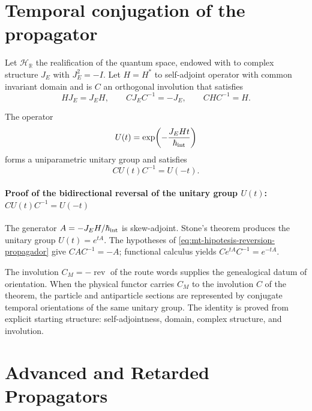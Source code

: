 \section{Temporal conjugation of the propagator}

Let $\mathcal H_{\mathbb R}$ the realification of the quantum space, endowed
with to complex structure $J_E$ with $J_E^2=-I$. Let $H=H^*$ to self-adjoint operator
with common invariant domain and is $C$ an orthogonal involution
that satisfies
\begin{equation}
 HJ_E=J_EH,\qquad
 CJ_EC^{-1}=-J_E,
 \qquad CHC^{-1}=H.
 \label{eq:mt-hipotesis-reversion-propagador}
\end{equation}

\begin{resultado}[title={Theorem: Bidirectional reversal of the evolution group}]
\label{thm:mt-reversion-propagador}
The operator
\begin{equation}
 U(t)=\exp\!\left(-\frac{J_EHt}{\hbar_{\rm int}}\right)
 \label{eq:mt-grupo-evolucion}
\end{equation}
forms a uniparametric unitary group and satisfies
\begin{equation}
 \boxed{CU(t)C^{-1}=U(-t)}.
 \label{eq:mt-reversion-unitaria}
\end{equation}
\end{resultado}

\paragraph{Proof of the bidirectional reversal of the unitary group \(U(t)\): \(CU(t)C^{-1}=U(-t)\)}
The generator $A=-J_EH/\hbar_{\rm int}$ is skew-adjoint. Stone's theorem
produces the unitary group $U(t)=e^{tA}$. The hypotheses of
\eqref{eq:mt-hipotesis-reversion-propagador} give $CAC^{-1}=-A$; functional
calculus yields $Ce^{tA}C^{-1}=e^{-tA}$.


The involution $C_M=-\operatorname{rev}$ of the route words supplies the
genealogical datum of orientation. When the physical functor carries $C_M$ to the
involution $C$ of the theorem, the particle and antiparticle sections are
represented by conjugate temporal orientations of the same unitary
group. The identity is proved from explicit starting structure:
self-adjointness, domain, complex structure, and involution.

\section{Advanced and Retarded Propagators}

